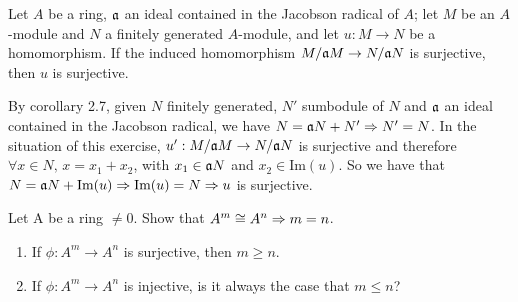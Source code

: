 \begin{ex}
Let $A$ be a ring, $\mathfrak{a}$ an ideal contained in the Jacobson radical of $A$; let $M$ be an $A$-module and $N$ a finitely generated $A$-module, and let $u: M \to N$ be a homomorphism. If the induced homomorphism $M/ \mathfrak{a} M  \to N/ \mathfrak{a} N$ is surjective, then $u$ is surjective.
\end{ex}

\begin{sol}
	By corollary 2.7, given $N$ finitely generated, $N'$ sumbodule of $N$ and $\mathfrak{a}$ an ideal contained in the Jacobson radical, we have $N = \mathfrak{a} N + N' \Rightarrow N' = N$. In the situation of this exercise, $u': M/ \mathfrak{a} M  \to N/ \mathfrak{a} N$ is surjective and therefore $\forall x \in N, \, x = x_1 + x_2$, with $x_1 \in \mathfrak{a} N$ and $x_2 \in \text{Im}(u)$. So we have that $N = \mathfrak{a} N + \text{Im}(u) \Rightarrow \text{Im}(u) = N \Rightarrow u$ is surjective.
\end{sol}

\begin{ex}
	Let A be a ring $\neq 0$. Show that $A^m \cong A^n \Rightarrow m = n$.
	\begin{enumerate}[label=(\roman*)]
		\item If $\phi: A^m \to A^n$ is surjective, then $m \geq n$.
		\item If $\phi: A^m \to A^n$ is injective, is it always the case that $m \leq n$?
	\end{enumerate}

\end{ex}

